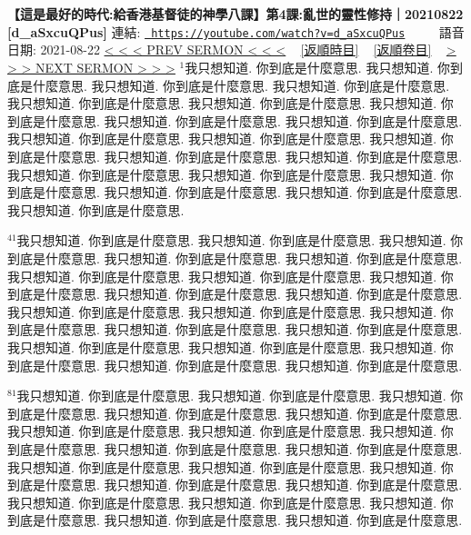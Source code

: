\documentclass{book}
\begin{document}
\section{}
\label{sec:d_aSxcuQPus}
\textbf{【這是最好的時代:給香港基督徒的神學八課】第4課:亂世的靈性修持｜20210822 [d\_aSxcuQPus]}
\newline
\newline
連結: \href{https://youtube.com/watch?v=d_aSxcuQPus}{\texttt{ https://youtube.com/watch?v=d\_aSxcuQPus}} ~~~~ 語音日期: 2021-08-22 
\newline
\newline
\hyperref[sec:gexfrTB3Ccc]{\small{< < < PREV SERMON < < <}}
~
\hyperref[sec:index_chronic]{\small{[返順時目]}}
~
\hyperref[sec:index_scriptual]{\small{[返順卷目]}}
~
\hyperref[sec:VhMBgPBkDi8]{\small{> > > NEXT SERMON > > >}}
\newline
\newline
$^{1}$我只想知道.
你到底是什麼意思.
我只想知道.
你到底是什麼意思.
我只想知道.
你到底是什麼意思.
我只想知道.
你到底是什麼意思.
我只想知道.
你到底是什麼意思.
我只想知道.
你到底是什麼意思.
我只想知道.
你到底是什麼意思.
我只想知道.
你到底是什麼意思.
我只想知道.
你到底是什麼意思.
我只想知道.
你到底是什麼意思.
我只想知道.
你到底是什麼意思.
我只想知道.
你到底是什麼意思.
我只想知道.
你到底是什麼意思.
我只想知道.
你到底是什麼意思.
我只想知道.
你到底是什麼意思.
我只想知道.
你到底是什麼意思.
我只想知道.
你到底是什麼意思.
我只想知道.
你到底是什麼意思.
我只想知道.
你到底是什麼意思.
我只想知道.
你到底是什麼意思.

$^{41}$我只想知道.
你到底是什麼意思.
我只想知道.
你到底是什麼意思.
我只想知道.
你到底是什麼意思.
我只想知道.
你到底是什麼意思.
我只想知道.
你到底是什麼意思.
我只想知道.
你到底是什麼意思.
我只想知道.
你到底是什麼意思.
我只想知道.
你到底是什麼意思.
我只想知道.
你到底是什麼意思.
我只想知道.
你到底是什麼意思.
我只想知道.
你到底是什麼意思.
我只想知道.
你到底是什麼意思.
我只想知道.
你到底是什麼意思.
我只想知道.
你到底是什麼意思.
我只想知道.
你到底是什麼意思.
我只想知道.
你到底是什麼意思.
我只想知道.
你到底是什麼意思.
我只想知道.
你到底是什麼意思.
我只想知道.
你到底是什麼意思.
我只想知道.
你到底是什麼意思.

$^{81}$我只想知道.
你到底是什麼意思.
我只想知道.
你到底是什麼意思.
我只想知道.
你到底是什麼意思.
我只想知道.
你到底是什麼意思.
我只想知道.
你到底是什麼意思.
我只想知道.
你到底是什麼意思.
我只想知道.
你到底是什麼意思.
我只想知道.
你到底是什麼意思.
我只想知道.
你到底是什麼意思.
我只想知道.
你到底是什麼意思.
我只想知道.
你到底是什麼意思.
我只想知道.
你到底是什麼意思.
我只想知道.
你到底是什麼意思.
我只想知道.
你到底是什麼意思.
我只想知道.
你到底是什麼意思.
我只想知道.
你到底是什麼意思.
我只想知道.
你到底是什麼意思.
我只想知道.
你到底是什麼意思.
我只想知道.
你到底是什麼意思.
我只想知道.
你到底是什麼意思.
\end{document}
